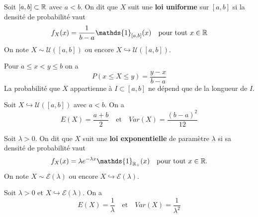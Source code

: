 \documentclass[a4paper, 12pt]{article}
\begin{document}
\begin{definition}
    Soit $[a, b] \subset \mathbb{R}$ avec $a < b$. On dit que $X$ suit une \textbf{loi uniforme} sur $[a, b]$ si la densité de probabilité vaut
    $$
    f_X(x) = \dfrac{1}{b - a} \mathds{1}_{[a, b]}(x) \quad \text{pour tout } x \in \R
    $$
    On note $X \sim \mathcal{U}([a, b])$ ou encore $X \hookrightarrow \mathcal{U}([a, b])$.
\end{definition}

\begin{remarque}
    Pour $a \leq x < y \leq b$ on a
    $$
    P(x \leq X \leq y) = \dfrac{y - x}{b - a}
    $$
    La probabilité que $X$ appartienne à $I \subset [a, b]$ ne dépend que de la longueur de $I$.
\end{remarque}

\begin{proposition}{}{}
    Soit $X \hookrightarrow \mathcal{U}([a, b])$ avec $a < b$. On a
    $$
    E(X) = \dfrac{a + b}{2} \quad \text{et} \quad Var(X) = \dfrac{(b - a)^2}{12}
    $$
\end{proposition}

\begin{definition}
    Soit $\lambda > 0$. On dit que $X$ suit une \textbf{loi exponentielle} de paramètre $\lambda$
    si sa densité de probabilité vaut
    $$
    f_X(x) = \lambda e^{-\lambda x} \mathds{1}_{\R_+}(x) \quad \text{pour tout } x \in \R.
    $$
    On note $X \sim \mathcal{E}(\lambda)$ ou encore $X \hookrightarrow \mathcal{E}(\lambda)$.
\end{definition}

\begin{proposition}{}{}
    Soit $\lambda > 0$ et $X \hookrightarrow \mathcal{E}(\lambda)$. On a
    $$
    E(X) = \dfrac{1}{\lambda} \quad \text{et} \quad Var(X) = \dfrac{1}{\lambda^2}
    $$
\end{proposition}
\end{document}

